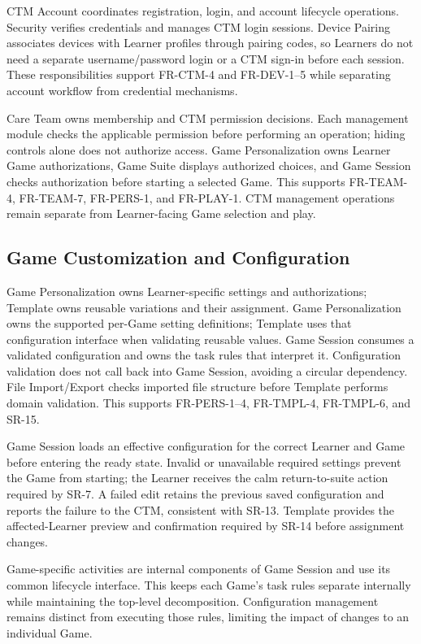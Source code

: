 \documentclass[12pt, titlepage]{article}
\begin{document}
CTM Account coordinates registration, login, and account lifecycle
operations. Security verifies credentials and manages CTM login sessions.
Device Pairing associates devices with Learner profiles through pairing
codes, so Learners do not need a separate username/password login or a
CTM sign-in before each session. These responsibilities support FR-CTM-4
and FR-DEV-1--5 while separating account workflow from credential mechanisms.

Care Team owns membership and CTM permission decisions. Each management
module checks the applicable permission before performing an operation;
hiding controls alone does not authorize access. Game Personalization
owns Learner Game authorizations, Game Suite displays authorized choices,
and Game Session checks authorization before starting a selected Game.
This supports FR-TEAM-4, FR-TEAM-7, FR-PERS-1, and FR-PLAY-1. CTM management
operations remain separate from Learner-facing Game selection and play.

\subsection*{Game Customization and Configuration}

Game Personalization owns Learner-specific settings and authorizations;
Template owns reusable variations and their assignment. Game Personalization owns the supported per-Game setting definitions;
Template uses that configuration interface when validating reusable values.
Game Session consumes a validated configuration and owns the task rules
that interpret it. Configuration validation does not call back into Game
Session, avoiding a circular dependency. File Import/Export checks
imported file structure before Template performs domain validation.
This supports FR-PERS-1--4, FR-TMPL-4, FR-TMPL-6, and SR-15.

Game Session loads an effective configuration for the correct Learner and
Game before entering the ready state. Invalid or unavailable required
settings prevent the Game from starting; the Learner receives the calm
return-to-suite action required by SR-7. A failed edit retains the previous
saved configuration and reports the failure to the CTM, consistent with
SR-13. Template provides the affected-Learner preview and confirmation
required by SR-14 before assignment changes.

Game-specific activities are internal components of Game Session and use
its common lifecycle interface. This keeps each Game's task rules separate
internally while maintaining the top-level decomposition. Configuration
management remains distinct from executing those rules, limiting the
impact of changes to an individual Game.
\end{document}
